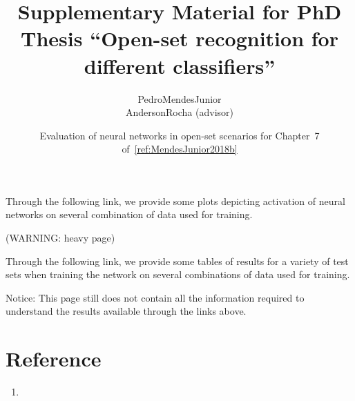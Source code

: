 

% 

\renewcommand\highlightauthorname[1]{#1}

\title{Supplementary Material for PhD Thesis ``Open-set recognition for different classifiers''}
\author{\gls{PedroMendesJunior}\\%
  \gls{AndersonRocha} (advisor)\\%
}
\date{Evaluation of neural networks in open-set scenarios for Chapter~7 of~\ref{ref:MendesJunior2018b}}



\maketitle


Through the following link, we provide some plots depicting activation of neural networks on several combination of data used for training.

\begin{center}
   (WARNING: heavy page)
\end{center}

Through the following link, we provide some tables of results for a variety of test sets when training the network on several combinations of data used for training.

\begin{center}
\end{center}

Notice: This page still does not contain all the information required to understand the results available through the links above.

\section*{Reference}

\begin{enumerate}
\item{}
\end{enumerate}




